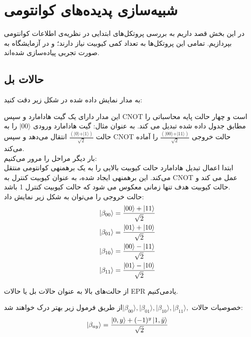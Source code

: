 \documentclass{book}
\begin{document}
\chapter{شبیه‌سازی پدیده‌های کوانتومی}
در این بخش قصد داریم به بررسی پروتکل‌های ابتدایی در نظریه‌ی اطلاعات کوانتومی بپردازیم. تمامی این پروتکل‌ها به تعداد کمی کیوبیت نیاز دارند؛ و در آزمایشگاه به صورت تجربی پیاده‌سازی شده‌اند. 
\section{حالات بل}
به مدار نمایش داده شده در شکل زیر دقت کنید:

این مدار دارای یک گیت هادامارد و سپس CNOT است و چهار حالت پایه محاسباتی را مطابق جدول داده شده تبدیل می کند. به عنوان مثال:
 گیت هادامارد ورودی $\vert 00 \rangle$ را به حالت  $\frac{(\vert 0 \rangle + \vert 1 \rangle)}{\sqrt{2}}$ انتقال می‌دهد و سپس CNOT حالت خروجی $\frac{(\vert 00 \rangle + \vert 11 \rangle)}{\sqrt{2}}$ را آماده می‌کند.\\ 
 
 بار دیگر مراحل را مرور می‌کنیم:\\
  ابتدا اعمال تبدیل هادامارد حالت کیوبیت بالایی را به یک برهمنهی کوانتومی منتقل می‌کند. این برهمنهی ایجاد شده،‌ به عنوان کیوبیت کنترل به CNOT عمل می کند و حالت کیوبیت هدف تنها زمانی معکوس می شود که حالت کیوبیت کنترل 1 باشد.\\
  
  
حالت خروجی را می‌توان به شکل زیر نمایش داد:\\

\begin{equation}
	\begin{split}
		\ket{\beta_{00}} &= \frac{\ket{00} + \ket{11}}{\sqrt{2}} \\
		\ket{\beta_{01}} &= \frac{\ket{01} + \ket{10}}{\sqrt{2}} \\
		\ket{\beta_{10}} &= \frac{\ket{00} - \ket{11}}{\sqrt{2}} \\
		\ket{\beta_{11}} &= \frac{\ket{01} - \ket{10}}{\sqrt{2}}
	\end{split}	
\end{equation}

 از حالت‌های بالا به عنوان حالات بل یا حالات EPR یاد‌می‌کنیم.
  
  
خصوصیات حالات $\vert \beta_{00} \rangle, \vert \beta_{01} \rangle, \vert \beta_{10} \rangle, \vert \beta_{11} \rangle,$از طریق فرمول زیر بهتر درک خواهند شد:
\begin{equation}\label{Bell formula}
	\ket{\beta_{ay}} = \frac{\ket{0, y} + (-1)^{y} \ket{1, \bar{y}}}{\sqrt{2}}
\end{equation}
\end{document}
